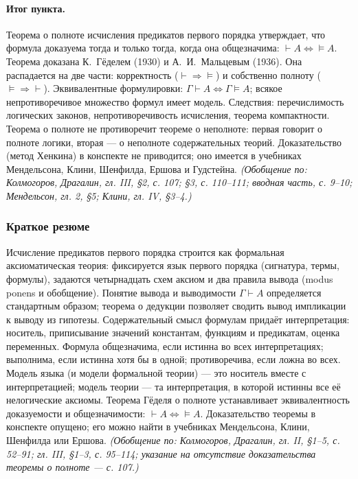 \documentclass[a4paper,12pt]{article}
\begin{document}
\paragraph{Итог пункта.} Теорема о полноте исчисления предикатов первого порядка утверждает, что формула доказуема тогда и только тогда, когда она общезначима: \(\vdash A\Leftrightarrow\models A\). Теорема доказана К.~Гёделем (1930) и А.~И.~Мальцевым (1936). Она распадается на две части: корректность (\(\vdash\Rightarrow\models\)) и собственно полноту (\(\models\Rightarrow\vdash\)). Эквивалентные формулировки: \(\Gamma\vdash A\Leftrightarrow\Gamma\models A\); всякое непротиворечивое множество формул имеет модель. Следствия: перечислимость логических законов, непротиворечивость исчисления, теорема компактности. Теорема о полноте не противоречит теореме о неполноте: первая говорит о полноте логики, вторая — о неполноте содержательных теорий. Доказательство (метод Хенкина) в конспекте не приводится; оно имеется в учебниках Мендельсона, Клини, Шенфилда, Ершова и Гудстейна.
\textit{(Обобщение по: Колмогоров, Драгалин, гл. III, §2, с. 107; §3, с. 110--111; вводная часть, с. 9--10; Мендельсон, гл. 2, §5; Клини, гл. IV, §3--4.)}

\subsubsection{Краткое резюме}

Исчисление предикатов первого порядка строится как формальная аксиоматическая теория: фиксируется язык первого порядка (сигнатура, термы, формулы), задаются четырнадцать схем аксиом и два правила вывода (modus ponens и обобщение). Понятие вывода и выводимости \(\Gamma\vdash A\) определяется стандартным образом; теорема о дедукции позволяет сводить вывод импликации к выводу из гипотезы. Содержательный смысл формулам придаёт интерпретация: носитель, приписывание значений константам, функциям и предикатам, оценка переменных. Формула общезначима, если истинна во всех интерпретациях; выполнима, если истинна хотя бы в одной; противоречива, если ложна во всех. Модель языка (и модели формальной теории) --- это носитель вместе с интерпретацией; модель теории --- та интерпретация, в которой истинны все её нелогические аксиомы. Теорема Гёделя о полноте устанавливает эквивалентность доказуемости и общезначимости: \(\vdash A\Leftrightarrow\models A\). Доказательство теоремы в конспекте опущено; его можно найти в учебниках Мендельсона, Клини, Шенфилда или Ершова.
\textit{(Обобщение по: Колмогоров, Драгалин, гл. II, §1--5, с. 52--91; гл. III, §1--3, с. 95--114; указание на отсутствие доказательства теоремы о полноте --- с. 107.)}
\end{document}
